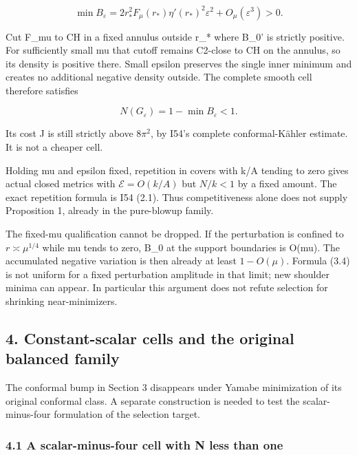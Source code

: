 \documentclass[
  10pt,
]{article}
\begin{document}
\[
 \min B_\varepsilon
 =2r_*^2F_\mu(r_*)\eta'(r_*)^2\varepsilon^2+O_\mu(\varepsilon^3)>0.
 \tag{3.4}
\]

Cut F\_mu to CH in a fixed annulus outside r\_* where B\_0' is strictly
positive. For sufficiently small mu that cutoff remains C2-close to CH
on the annulus, so its density is positive there. Small epsilon
preserves the single inner minimum and creates no additional negative
density outside. The complete smooth cell therefore satisfies

\[
 N(G_\varepsilon)=1-\min B_\varepsilon<1. \tag{3.5}
\]

Its cost J is still strictly above \(8\pi^2\), by I54's complete
conformal-Kähler estimate. It is not a cheaper cell.

Holding mu and epsilon fixed, repetition in covers with k/A tending to
zero gives actual closed metrics with \(\mathcal E=O(k/A)\) but
\(N/k<1\) by a fixed amount. The exact repetition formula is I54 (2.1).
Thus competitiveness alone does not supply Proposition 1, already in the
pure-blowup family.

The fixed-mu qualification cannot be dropped. If the perturbation is
confined to \(r\asymp\mu^{1/4}\) while mu tends to zero, B\_0 at the
support boundaries is O(mu). The accumulated negative variation is then
already at least \(1-O(\mu)\). Formula (3.4) is not uniform for a fixed
perturbation amplitude in that limit; new shoulder minima can appear. In
particular this argument does not refute selection for shrinking
near-minimizers.

\hypertarget{constant-scalar-cells-and-the-original-balanced-family}{%
\subsection{4. Constant-scalar cells and the original balanced
family}\label{constant-scalar-cells-and-the-original-balanced-family}}

The conformal bump in Section 3 disappears under Yamabe minimization of
its original conformal class. A separate construction is needed to test
the scalar-minus-four formulation of the selection target.

\hypertarget{a-scalar-minus-four-cell-with-n-less-than-one}{%
\subsubsection{4.1 A scalar-minus-four cell with N less than
one}\label{a-scalar-minus-four-cell-with-n-less-than-one}}
\end{document}
